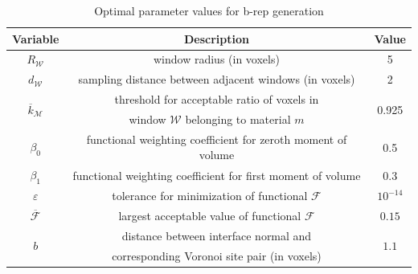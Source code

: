 \begin{table}[ht!]
 \centering
   \begin{tabular}{|c||c|c|}
   \hline 
   \textbf{Variable} & \textbf{Description} & \textbf{Value} \\ \hline \hline
   $R_{\mathcal{W}}$ & window radius (in voxels) & 5 \\ \hline
   $d_{\mathcal{W}}$ & sampling distance between adjacent windows (in voxels) & 2 \\ \hline
   \multirow{2}{*}{$\overline{k}_{\mathcal{M}}$ \rule{0mm}{4mm}} & threshold for acceptable ratio of voxels in & \multirow{2}{*}{0.925} \\
   {} & window $\mathcal{W}$ belonging to material $m$ & {} \\ \hline
   $\beta_0$ & functional weighting coefficient for zeroth moment of volume & 0.5 \\ \hline
   $\beta_1$ & functional weighting coefficient for first moment of volume & 0.3 \\ \hline   
   $\varepsilon$ & tolerance for minimization of functional $\mathcal{F}$ & $10^{-14}$ \rule{0mm}{4mm} \\ \hline
   $\overline{\mathcal{F}}$ \rule{0mm}{4mm} & largest acceptable value of functional $\mathcal{F}$ & $0.15$ \\ \hline
   \multirow{2}{*}{$b$} & distance between interface normal and & \multirow{2}{*}{$1.1$} \\
   {} & corresponding Voronoi site pair (in voxels) & {} \\ \hline
\end{tabular}
\caption{Optimal parameter values for b-rep generation}
\label{tab:Mod5}
\end{table}

